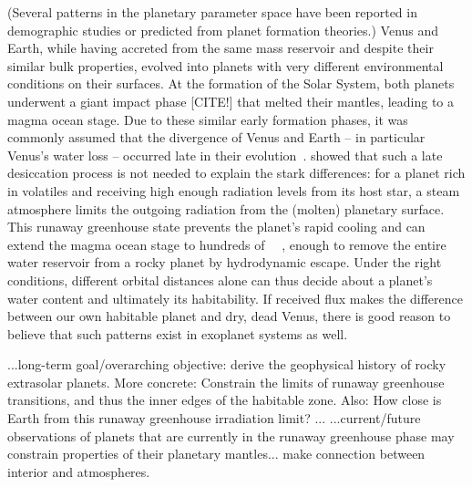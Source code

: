 \documentclass[modern]{aastex631}
\begin{document}
\begin{note}
(Several patterns in the planetary parameter space have been reported in demographic studies or predicted from planet formation theories.)
    Venus and Earth, while having accreted from the same mass reservoir and despite their similar bulk properties, evolved into planets with very different environmental conditions on their surfaces.
    At the formation of the Solar System, both planets underwent a giant impact phase [CITE!] that melted their mantles, leading to a magma ocean stage.
    Due to these similar early formation phases, it was commonly assumed that the divergence of Venus and Earth -- in particular Venus's water loss -- occurred late in their evolution~\citep{Elkins-Tanton2013}.
    \citet{Hamano2013} showed that such a late desiccation process is not needed to explain the stark differences: for a planet rich in volatiles and receiving high enough radiation levels from its host star, a steam atmosphere limits the outgoing radiation from the (molten) planetary surface.
    This runaway greenhouse state prevents the planet's rapid cooling and can extend the magma ocean stage to hundreds of \SI{}{\mega\year}, enough to remove the entire water reservoir from a rocky planet by hydrodynamic escape.
    Under the right conditions, different orbital distances alone can thus decide about a planet's water content and ultimately its habitability.
    If received flux makes the difference between our own habitable planet and dry, dead Venus, there is good reason to believe that such patterns exist in exoplanet systems as well.

    ...long-term goal/overarching objective: derive the geophysical history of rocky extrasolar planets. More concrete: Constrain the limits of runaway greenhouse transitions, and thus the inner edges of the habitable zone. Also: How close is Earth from this runaway greenhouse irradiation limit?
   ...
    ...current/future observations of planets that are currently in the runaway greenhouse phase may constrain properties of their planetary mantles... make connection between interior and atmospheres.
\end{note}
\end{document}
